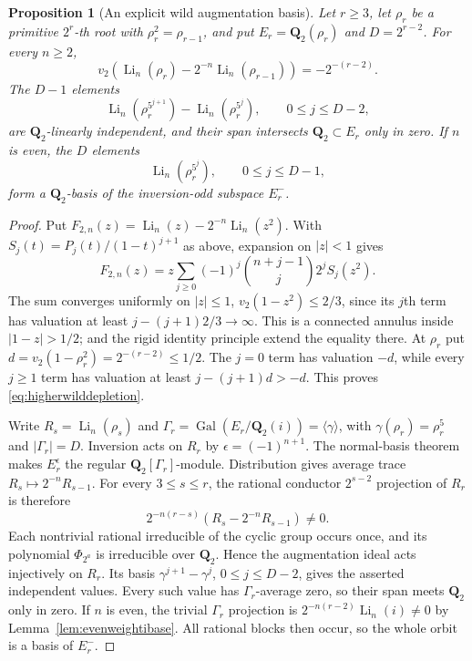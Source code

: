 \documentclass[11pt,a4paper]{article}
\newtheorem{proposition}[theorem]{Proposition}
\theoremstyle{remark}
\newcommand{\Q}{\mathbf Q}
\newcommand{\Gal}{\operatorname{Gal}}
\begin{document}
\begin{proposition}[An explicit wild augmentation basis]
\label{prop:higherwildaugmentation}
Let $r\geq3$, let $\rho_r$ be a primitive $2^r$-th root with
$\rho_r^2=\rho_{r-1}$, and put
$E_r=\Q_2(\rho_r)$ and $D=2^{r-2}$.
For every $n\geq2$,
\begin{equation}\label{eq:higherwilddepletion}
 v_2\left(\operatorname{Li}_n(\rho_r)
       -2^{-n}\operatorname{Li}_n(\rho_{r-1})\right)
 =-2^{-(r-2)}.
\end{equation}
The $D-1$ elements
\[
 \operatorname{Li}_n(\rho_r^{5^{j+1}})
 -\operatorname{Li}_n(\rho_r^{5^j}),
 \qquad 0\leq j\leq D-2,
\]
are $\Q_2$-linearly independent, and their span intersects
$\Q_2\subset E_r$ only in zero.
If $n$ is even, the $D$ elements
\[
 \operatorname{Li}_n(\rho_r^{5^j}),\qquad 0\leq j\leq D-1,
\]
form a $\Q_2$-basis of the inversion-odd subspace $E_r^-$.
\end{proposition}
\begin{proof}
Put $F_{2,n}(z)=\operatorname{Li}_n(z)-2^{-n}\operatorname{Li}_n(z^2)$.
With $S_j(t)=P_j(t)/(1-t)^{j+1}$ as above, expansion on $|z|<1$ gives
\[
 F_{2,n}(z)=z\sum_{j\geq0}(-1)^j
       \binom{n+j-1}{j}2^j S_j(z^2).
\]
The sum converges uniformly on
$|z|\leq1$, $v_2(1-z^2)\leq2/3$, since its $j$th term has
valuation at least $j-(j+1)2/3\to\infty$.
This is a connected annulus inside $|1-z|>1/2$;
\cite[Theorem~2.7(3)]{BesserDeJeuAlgorithm} and the rigid identity
principle extend the equality there. At $\rho_r$ put
$d=v_2(1-\rho_r^2)=2^{-(r-2)}\leq1/2$.
The $j=0$ term has valuation $-d$, while every $j\geq1$ term
has valuation at least $j-(j+1)d>-d$.
This proves \eqref{eq:higherwilddepletion}.

Write $R_s=\operatorname{Li}_n(\rho_s)$ and
$\Gamma_r=\Gal(E_r/\Q_2(i))=\langle\gamma\rangle$, with
$\gamma(\rho_r)=\rho_r^5$ and $|\Gamma_r|=D$.
Inversion acts on $R_r$ by $\epsilon=(-1)^{n+1}$.
The normal-basis theorem makes $E_r^\epsilon$ the regular
$\Q_2[\Gamma_r]$-module. Distribution gives average trace
$R_s\mapsto2^{-n}R_{s-1}$.
For every $3\leq s\leq r$, the rational conductor
$2^{s-2}$ projection of $R_r$ is therefore
\[
 2^{-n(r-s)}(R_s-2^{-n}R_{s-1})\ne0.
\]
Each nontrivial rational irreducible of the cyclic group occurs
once, and its polynomial $\Phi_{2^a}$ is irreducible over $\Q_2$.
Hence the augmentation ideal acts injectively on $R_r$.
Its basis $\gamma^{j+1}-\gamma^j$, $0\leq j\leq D-2$, gives
the asserted independent values. Every such value has
$\Gamma_r$-average zero, so their span meets $\Q_2$ only in zero.
If $n$ is even, the trivial $\Gamma_r$ projection is
$2^{-n(r-2)}\operatorname{Li}_n(i)\ne0$ by
Lemma~\ref{lem:evenweightibase}. All rational blocks then occur,
so the whole orbit is a basis of $E_r^-$.
\end{proof}
\end{document}
